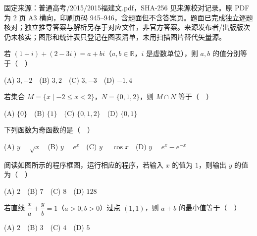 

\begin{gktip}
固定来源：普通高考/2015/2015福建文.pdf，SHA-256 见来源校对记录。原 PDF 为 2 页 A3 横向，印刷页码 945–946，含题面但不含答案页。题面已完成独立逐题核对；独立推导答案与解析另存于对应文件，非官方答案。来源发布者/出版版次仍未核实；图形和统计表只登记在图表清单，未用扫描图片替代矢量源。
\end{gktip}


\begin{question}

若 \((1+i)+(2-3i)=a+bi\)（\(a,b\in\mathbb R\)，\(i\) 是虚数单位），则 \(a,b\) 的值分别等于（　）

(A) \(3,-2\)　(B) \(3,2\)　(C) \(3,-3\)　(D) \(-1,4\)

\end{question}
\begin{question}

若集合 \(M=\{x\mid -2\leqslant x<2\}\)，\(N=\{0,1,2\}\)，则 \(M\cap N\) 等于（　）

(A) \(\{0\}\)　(B) \(\{1\}\)　(C) \(\{0,1,2\}\)　(D) \(\{0,1\}\)

\end{question}
\begin{question}

下列函数为奇函数的是（　）

(A) \(y=\sqrt{x}\)　(B) \(y=e^x\)　(C) \(y=\cos x\)　(D) \(y=e^x-e^{-x}\)

\Needspace{0.4\textheight}
\end{question}
\begin{question}

阅读如图所示的程序框图，运行相应的程序，若输入 \(x\) 的值为 \(1\)，则输出 \(y\) 的值为（　）

(A) \(2\)　(B) \(7\)　(C) \(8\)　(D) \(128\)
\nopagebreak[4]
\begin{center}\end{center}
\nopagebreak[4]
\end{question}
\begin{question}

若直线 \(\dfrac{x}{a}+\dfrac{y}{b}=1\)（\(a>0,b>0\)）过点 \((1,1)\)，则 \(a+b\) 的最小值等于（　）

(A) \(2\)　(B) \(3\)　(C) \(4\)　(D) \(5\)

\end{question}
